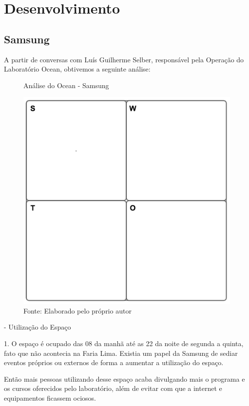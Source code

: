 \chapter{Desenvolvimento}
\label{cha:desenvolvimento}

\section{Samsung}

A partir de conversas com Luís Guilherme Selber, responsável pela Operação do Laboratório Ocean, obtivemos a seguinte análise:

\begin{figure}[h]
\caption{Análise do Ocean - Samsung}
\centerline{\includegraphics[scale=0.5]{img/generalswot}}
\label{fig:swotsamsung}
\caption* {Fonte: Elaborado pelo próprio autor}
\end{figure}

- Utilização do Espaço

1. O espaço é ocupado das 08 da manhã até as 22 da noite de segunda a quinta, fato que não acontecia na Faria Lima. Existia um papel da Samsung de sediar eventos próprios ou externos de forma a aumentar a utilização do espaço. 

Então mais pessoas utilizando desse espaço acaba divulgando mais o programa e os cursos oferecidos pelo laboratório, além de evitar com que a internet e equipamentos ficassem ociosos.

